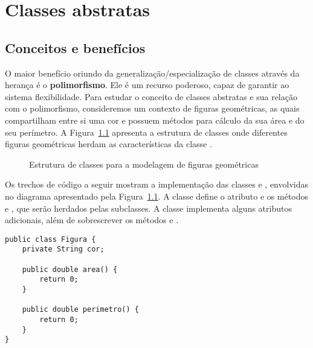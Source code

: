 \chapter{Classes abstratas}

\section{Conceitos e benefícios}

O maior benefício oriundo da generalização/especialização de classes através da herança é o \textbf{polimorfismo}. Ele é um recurso poderoso, capaz de garantir ao sistema flexibilidade. Para estudar o conceito de classes abstratas e sua relação com o polimorfismo, consideremos um contexto de figuras geométricas, as quais compartilham entre si uma cor e possuem métodos para cálculo da sua área e do seu perímetro. A Figura~\ref{fig:abstratas-figuras} apresenta a estrutura de classes onde diferentes figuras geométricas herdam as características da classe .

\begin{figure}[h]
	\centering
	
	
	\caption{Estrutura de classes para a modelagem de figuras geométricas}
	\label{fig:abstratas-figuras}
\end{figure}

Os trechos de código a seguir mostram a implementação das classes  e , envolvidas no diagrama apresentado pela Figura~\ref{fig:abstratas-figuras}. A classe  define o atributo  e os métodos  e , que serão herdados pelas subclasses. A classe  implementa alguns atributos adicionais, além de sobrescrever os métodos  e .

\begin{verbatim}
public class Figura {
	private String cor;
	
	public double area() {
		return 0;
	}
	
	public double perimetro() {
		return 0;
	}
}
\end{verbatim}

